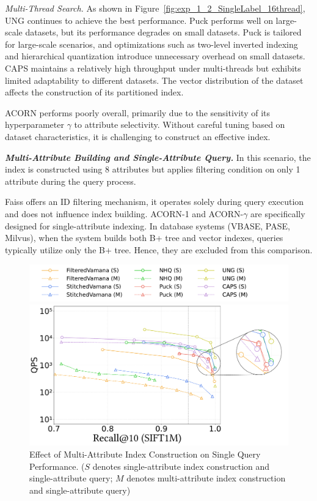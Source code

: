 \documentclass[sigconf, nonacm]{acmart}
\begin{document}
	\textit{Multi-Thread Search.}
	As shown in Figure~\ref{fig:exp_1_2_SingleLabel_16thread}, UNG continues to achieve the best performance. Puck performs well on large-scale datasets, but its performance degrades on small datasets. Puck is tailored for large-scale scenarios, and optimizations such as two-level inverted indexing and hierarchical quantization introduce unnecessary overhead on small datasets. 
	CAPS maintains a relatively high throughput under multi-threads but exhibits limited adaptability to different datasets. The vector distribution of the dataset affects the construction of its partitioned index.
	
	ACORN performs poorly overall, primarily due to the sensitivity of its hyperparameter $\gamma$ to attribute selectivity. Without careful tuning based on dataset characteristics, it is challenging to construct an effective index.
	
	\textit{\textbf{Multi-Attribute Building and Single-Attribute Query.}}
	In this scenario, the index is constructed using 8 attributes but applies filtering condition on only 1 attribute during the query process.
	
	 Faiss offers an ID filtering mechanism, it operates solely during query execution and does not influence index building. ACORN-1 and ACORN-\(\gamma\) are specifically designed for single-attribute indexing. In database systems (VBASE, PASE, Milvus), when the system builds both B+ tree and vector indexes, queries typically utilize only the B+ tree. Hence, they are excluded from this comparison.
	
	\begin{figure}[th]
		\centering
		\setlength{\abovecaptionskip}{0.1cm}
		\setlength{\belowcaptionskip}{-0.1cm}
		\hspace*{15pt} %
		\includegraphics[width=0.98\columnwidth]{figures/exp/exp_2_legend.pdf} %
		
		
		\includegraphics[width=0.8\columnwidth]{figures/exp/exp_2_1.pdf}
		\caption{Effect of Multi-Attribute Index Construction on Single Query Performance. ($S$ denotes single-attribute index construction and single-attribute query; $M$ denotes multi-attribute index construction and single-attribute query)}
		\label{fig:exp_2_1}
		
	\end{figure}
	
\end{document}
